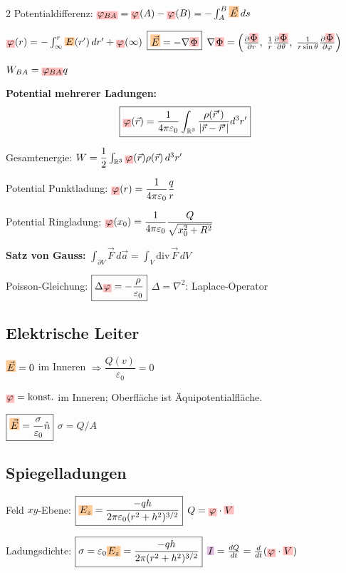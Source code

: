 \documentclass[10pt,a4paper]{article}
\newcommand{\icc}[1]{{\setlength\fboxsep{1pt}\colorbox{violet!25}{\ensuremath{#1}}}}
\newcommand{\efc}[1]{{\setlength\fboxsep{1pt}\colorbox{orange!40}{\ensuremath{#1}}}}
\newcommand{\vc}[1]{{\setlength\fboxsep{1pt}\colorbox{red!25}{\ensuremath{#1}}}}
\begin{document}
\begin{multicols}{2}
Potentialdifferenz: $\vc{\varphi_{BA}}=\vc{\varphi}(A)-\vc{\varphi}(B)=-\int_A^B\efc{\vec{E}}\,ds$

$\vc{\varphi}(r)=-\int_\infty^r \efc{E}(r')\,dr'+\vc{\varphi}(\infty)$ \quad $\boxed{\efc{\vec{E}}=-\nabla\vc{\Phi}}$ \quad $\nabla\vc{\Phi}=\left(\tfrac{\partial\vc{\Phi}}{\partial r},\;\tfrac{1}{r}\tfrac{\partial\vc{\Phi}}{\partial\theta},\;\tfrac{1}{r\sin\theta}\tfrac{\partial\vc{\Phi}}{\partial\varphi}\right)$

$W_{BA}=\vc{\varphi_{BA}}q$

\textbf{Potential mehrerer Ladungen:}
\[\boxed{\vc{\varphi}(\vec{r})=\frac{1}{4\pi\varepsilon_0}\int_{\mathbb{R}^3}\frac{\rho(\vec{r}')}{|\vec{r}-\vec{r}'|}d^3r'}\]

Gesamtenergie: $W=\dfrac{1}{2}\int_{\mathbb{R}^3}\vc{\varphi}(\vec{r})\rho(\vec{r})\,d^3r'$

Potential Punktladung: $\vc{\varphi}(r)=\dfrac{1}{4\pi\varepsilon_0}\dfrac{q}{r}$

Potential Ringladung: $\vc{\varphi}(x_0)=\dfrac{1}{4\pi\varepsilon_0}\dfrac{Q}{\sqrt{x_0^2+R^2}}$

\textbf{Satz von Gauss:} $\boxed{\int_{\partial V}\vec{F}\,d\vec{a}=\int_V\text{div}\,\vec{F}\,dV}$

Poisson-Gleichung: $\boxed{\Delta\vc{\varphi}=-\dfrac{\rho}{\varepsilon_0}}$ \quad $\Delta=\nabla^2$: Laplace-Operator

\subsection{Elektrische Leiter}

$\efc{\vec{E}}=0$ im Inneren $\Rightarrow\boxed{\dfrac{Q(v)}{\varepsilon_0}=0}$

$\vc{\varphi}=\text{konst.}$ im Inneren; Oberfläche ist Äquipotentialfläche.

$\boxed{\efc{\vec{E}}=\dfrac{\sigma}{\varepsilon_0}\hat{n}}$ \quad $\sigma=Q/A$

\subsection{Spiegelladungen}

Feld $xy$-Ebene: $\boxed{\efc{E_z}=\dfrac{-qh}{2\pi\varepsilon_0(r^2+h^2)^{3/2}}}$ \quad $Q=\vc{\varphi}\cdot \vc{V}$

Ladungsdichte: $\boxed{\sigma=\varepsilon_0 \efc{E_z}=\dfrac{-qh}{2\pi(r^2+h^2)^{3/2}}}$ \quad $\icc{I}=\tfrac{dQ}{dt}=\tfrac{d}{dt}(\vc{\varphi}\cdot \vc{V})$


\end{multicols}
\end{document}
